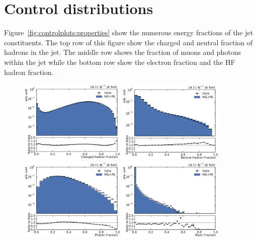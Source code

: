 \section{Control distributions}

Figure~\ref{fig:controlplots:properties} show the numerous energy fractions of the jet constituents. The top
row of this figure show the charged and neutral fraction of hadrons in the jet. The middle row shows
the fraction of muons and photons within the jet while the bottom row show the electron fraction and
the HF hadron fraction.

\begin{figure}[htbp]
    \centering
    \includegraphics[width=0.45\textwidth]{figures/measurement/jetprop_chf_default.pdf}\hfill
    \includegraphics[width=0.45\textwidth]{figures/measurement/jetprop_nhf_default.pdf}
    \includegraphics[width=0.45\textwidth]{figures/measurement/jetprop_gammaf_default.pdf}\hfill
    \includegraphics[width=0.45\textwidth]{figures/measurement/jetprop_muf_default.pdf}

\end{figure}
